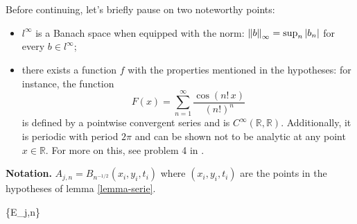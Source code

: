 \begin{remark}
Before continuing, let's briefly pause on two noteworthy points:
\begin{itemize}
\item
$l^{\infty}$ is a Banach space when equipped with the norm: $\left\lVert b\right\rVert_\infty=\sup_n|b_n|$ for every $b \in l^{\infty}$;
\item
there exists a function $f$ with the properties mentioned in the hypotheses: for instance, the function $$F(x)=\sum_{n=1}^\infty\frac{\cos(n!\,x)}{(n!)^n}$$ is defined by a pointwise convergent series and is $C^{\infty}(\mathbb{R},\mathbb{R})$. Additionally, it is periodic with period $2\pi$ and can be shown not to be analytic at any point $x\in\mathbb{R}$. For more on this, see problem 4 in \cite[cap.3]{John}.
\end{itemize}
\end{remark}
\textbf{Notation.} $A_{j,n} = B_{n^{-1/2}}(x_i,y_i,t_i)$ where $(x_i,y_i,t_i)$ are the points in the hypotheses of lemma \ref{lemma-serie}.
\begin{lemma}\label{lemma-e}
{\{E_{j,n}\} }
\end{lemma}

